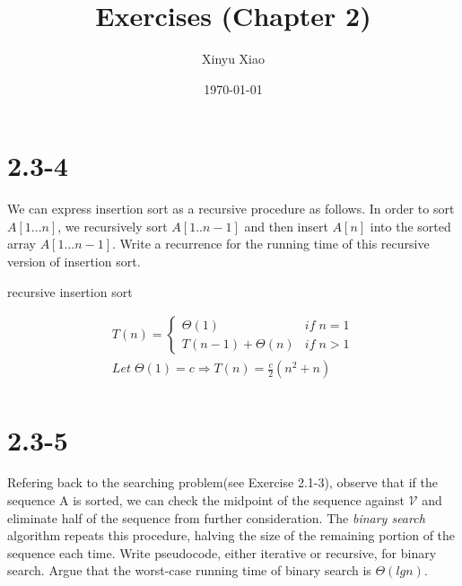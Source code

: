 \documentclass[a4paper, 11pt, UTF8]{article}
\title{Exercises (Chapter 2)}
\author{Xinyu Xiao}
\date{\today}
\begin{document}
\maketitle

\section*{2.3-4}
We can express insertion sort as a recursive procedure as follows. In order to
sort $A[1...n]$, we recursively sort $A[1..n-1]$ and then insert $A[n]$ into 
the sorted array $A[1...n-1]$. Write a recurrence for the running time of this
recursive version of insertion sort.


\begin{algorithm}
    \caption{recursive insertion sort}
    \begin{algorithmic}[1]
        \EndIf
        \EndFunction
    \end{algorithmic}
\end{algorithm}


\begin{align*}
    T(n) = 
    \left \lbrace 
    \begin{matrix}
        \Theta(1) & if \; n = 1 \\
        T(n-1) + \Theta(n) & if \; n > 1
    \end{matrix}
    \right . \\
    Let \; \Theta(1) = c \Rightarrow T(n) = \frac{c}{2}(n^2 + n) \\
\end{align*}


\section*{2.3-5}
Refering back to the searching problem(see Exercise 2.1-3), observe that if the
sequence A is sorted, we can check the midpoint of the sequence against 
$\mathcal{V}$ and eliminate half of the sequence from further consideration.
The \emph{binary search} algorithm repeats this procedure, halving the size of
the remaining portion of the sequence each time. Write pseudocode, either
iterative or recursive, for binary search. Argue that the worst-case running
time of binary search is  $\Theta(lgn)$.
\end{document}
